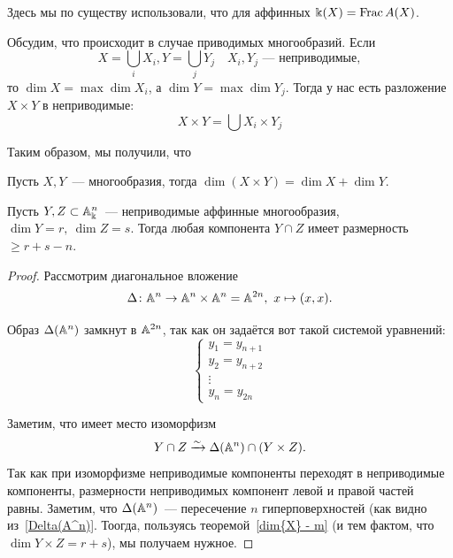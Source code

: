     	\begin{remark}
    		Здесь мы по существу использовали, что для аффинных $\bk(X) = \Frac{A(X)}$.
    	\end{remark}

    Обсудим, что происходит в случае приводимых многообразий. Если 
	\[
		X = \bigcup_{i} X_{i}, Y = \bigcup_{j} Y_{j} \quad X_{i}, Y_{j} \text{~--- неприводимые},
 	\]
 	то $\dim{X} = \max{\dim{X_i}}$, а $\dim{Y} = \max{\dim{Y_j}}$. Тогда у нас есть разложение $X \times Y$ в неприводимые:
 	\[
 		X \times Y = \bigcup X_i \times Y_j 
 	\]

 	Таким образом, мы получили, что 

 	\begin{statement} 
 		Пусть $X, Y$~--- многообразия, тогда $\dim(X \times Y) = \dim{X} + \dim{Y}$. 
 	\end{statement}

	    \begin{theorem} \hypertarget{bilet_17}{}
	    	Пусть $Y, Z \subset \AA_{\Bbbk}^n$~--- неприводимые аффинные многообразия, $\dim{Y} = r, \ \dim{Z} = s$. Тогда любая компонента $Y \cap Z$ имеет размерность $\ge r + s - n$.
	    \end{theorem}
	    \begin{proof}
	    	Рассмотрим диагональное вложение 
	    	\[
	    		\Delta\colon \AA^n \to \AA^{n} \times \AA^{n} = \AA^{2n}, \ x \mapsto (x, x). 
	    	\]

	    	Образ $\Delta(\AA^n)$ замкнут в $\AA^{2n}$, так как он задаётся вот такой системой уравнений: 
	    	\begin{equation}
	    		\begin{cases} y_1 = y_{n + 1} \\ y_2 = y_{n + 2} \\ \vdots \\ y_{n} = y_{2n} \end{cases} \label{Delta(A^n)}
	    	\end{equation}

	    	Заметим, что имеет место изоморфизм 
	    	\[
	    		Y \cap Z \xrightarrow{\sim} \Delta\lr*{\AA^n} \cap (Y \times Z).
	    	\]
	    	Так как при изоморфизме неприводимые компоненты переходят в неприводимые компоненты, размерности неприводимых компонент левой и правой частей равны. Заметим, что $\Delta(\AA^n)$~--- пересечение $n$ гиперповерхностей (как видно из~\ref{Delta(A^n)}. Тоогда, пользуясь теоремой~\ref{dim{X} - m} (и тем фактом, что $\dim{Y \times Z} = r + s$), мы получаем нужное. 

	    \end{proof}

